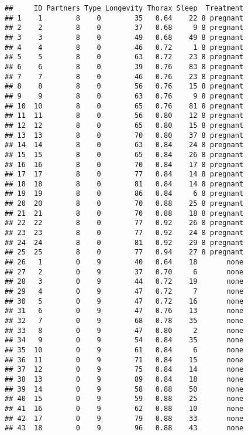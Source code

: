 \documentclass[]{article}
\begin{document}
\begin{verbatim}
##     ID Partners Type Longevity Thorax Sleep  Treatment
## 1    1        8    0        35   0.64    22 8 pregnant
## 2    2        8    0        37   0.68     9 8 pregnant
## 3    3        8    0        49   0.68    49 8 pregnant
## 4    4        8    0        46   0.72     1 8 pregnant
## 5    5        8    0        63   0.72    23 8 pregnant
## 6    6        8    0        39   0.76    83 8 pregnant
## 7    7        8    0        46   0.76    23 8 pregnant
## 8    8        8    0        56   0.76    15 8 pregnant
## 9    9        8    0        63   0.76     9 8 pregnant
## 10  10        8    0        65   0.76    81 8 pregnant
## 11  11        8    0        56   0.80    12 8 pregnant
## 12  12        8    0        65   0.80    15 8 pregnant
## 13  13        8    0        70   0.80    37 8 pregnant
## 14  14        8    0        63   0.84    24 8 pregnant
## 15  15        8    0        65   0.84    26 8 pregnant
## 16  16        8    0        70   0.84    17 8 pregnant
## 17  17        8    0        77   0.84    14 8 pregnant
## 18  18        8    0        81   0.84    14 8 pregnant
## 19  19        8    0        86   0.84     6 8 pregnant
## 20  20        8    0        70   0.88    25 8 pregnant
## 21  21        8    0        70   0.88    18 8 pregnant
## 22  22        8    0        77   0.92    26 8 pregnant
## 23  23        8    0        77   0.92    24 8 pregnant
## 24  24        8    0        81   0.92    29 8 pregnant
## 25  25        8    0        77   0.94    27 8 pregnant
## 26   1        0    9        40   0.64    18       none
## 27   2        0    9        37   0.70     6       none
## 28   3        0    9        44   0.72    19       none
## 29   4        0    9        47   0.72     7       none
## 30   5        0    9        47   0.72    16       none
## 31   6        0    9        47   0.76    13       none
## 32   7        0    9        68   0.78    35       none
## 33   8        0    9        47   0.80     2       none
## 34   9        0    9        54   0.84    35       none
## 35  10        0    9        61   0.84     6       none
## 36  11        0    9        71   0.84    15       none
## 37  12        0    9        75   0.84    14       none
## 38  13        0    9        89   0.84    18       none
## 39  14        0    9        58   0.88    50       none
## 40  15        0    9        59   0.88    25       none
## 41  16        0    9        62   0.88    10       none
## 42  17        0    9        79   0.88    33       none
## 43  18        0    9        96   0.88    43       none

\end{verbatim}
\end{document}
